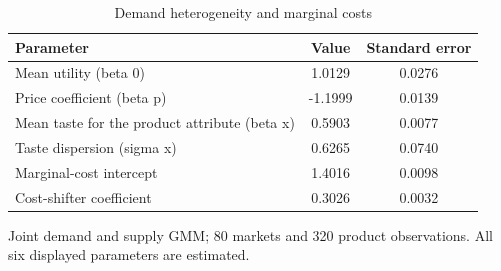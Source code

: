 \begingroup
\begin{table}[htbp]
\centering
\caption{Demand heterogeneity and marginal costs}
\label{tab:specialist-blp-random-r01-displays-parameters}
\begin{tabular}{lcc}
\toprule
Parameter & Value & Standard error \\
\midrule
Mean utility (beta 0) & 1.0129 & 0.0276 \\
Price coefficient (beta p) & -1.1999 & 0.0139 \\
Mean taste for the product attribute (beta x) & 0.5903 & 0.0077 \\
Taste dispersion (sigma x) & 0.6265 & 0.0740 \\
Marginal-cost intercept & 1.4016 & 0.0098 \\
Cost-shifter coefficient & 0.3026 & 0.0032 \\
\bottomrule
\end{tabular}
\par\medskip\begin{minipage}{\linewidth}\footnotesize
Joint demand and supply GMM; 80 markets and 320 product observations. All six displayed parameters are estimated.
\end{minipage}
\end{table}
\endgroup
